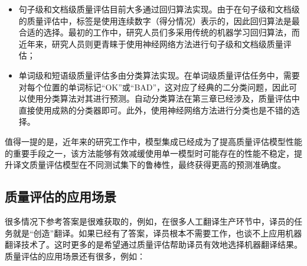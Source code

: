 \begin{itemize}
\vspace{0.5em}
\item 句子级和文档级质量评估目前大多通过回归算法实现。由于在句子级和文档级的质量评估中，标签是使用连续数字（得分情况）表示的，因此回归算法是最合适的选择。最初的工作中，研究人员们多采用传统的机器学习回归算法，而近年来，研究人员则更青睐于使用神经网络方法进行句子级和文档级质量评估；
\vspace{0.5em}
\item 单词级和短语级质量评估多由分类算法实现。在单词级质量评估任务中，需要对每个位置的单词标记“OK”或“BAD”，这对应了经典的二分类问题，因此可以使用分类算法对其进行预测。自动分类算法在第三章已经涉及，质量评估中直接使用成熟的分类器即可。此外，使用神经网络方法进行分类也是不错的选择。
\vspace{0.5em}
\end{itemize}

\parinterval 值得一提的是，近年来的研究工作中，模型集成已经成为了提高质量评估模型性能的重要手段之一，该方法能够有效减缓使用单一模型时可能存在的性能不稳定，提升译文质量评估模型在不同测试集下的鲁棒性，最终获得更高的预测准确度。

\subsection{质量评估的应用场景}

\parinterval 很多情况下参考答案是很难获取的，例如，在很多人工翻译生产环节中，译员的任务就是“创造”翻译。如果已经有了答案，译员根本不需要工作，也谈不上应用机器翻译技术了。这时更多的是希望通过质量评估帮助译员有效地选择机器翻译结果。质量评估的应用场景还有很多，例如：

